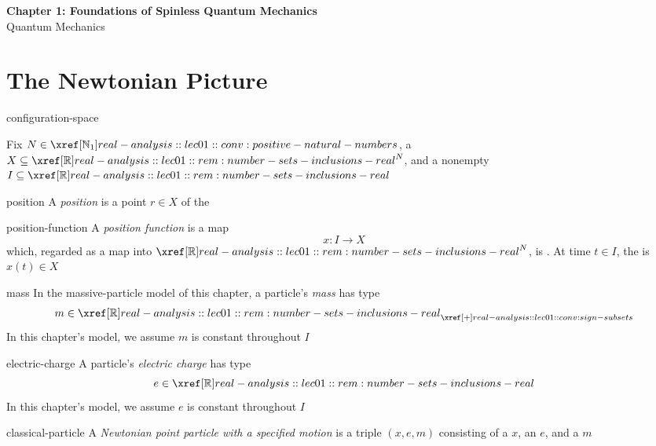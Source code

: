 \documentclass[12pt]{article}
\begin{document}
\begin{center}
  {\LARGE\bfseries Chapter 1: Foundations of Spinless Quantum Mechanics}\\[0.25em]
  {\large Quantum Mechanics}\\[0.15em]
\end{center}

\section{The Newtonian Picture}

\begin{dfn}{configuration-space}
  \todo
\end{dfn}

Fix $N\in\NNOne$, a 
$X\subseteq\RR^N$, and a nonempty 
$I\subseteq\RR$

\begin{dfn}[Position]{position}
  A \emph{position} is a point $r\in X$ of the
\end{dfn}

\begin{dfn}{position-function}
  A \emph{position function} is a map
  \[
    x:I\to X
  \]
  which, regarded as a map into $\RR^N$, is
  .
  At time $t\in I$, the  is $x(t)\in X$
\end{dfn}

\begin{dfn}[Mass]{mass}
  In the massive-particle model of this chapter, a particle's \emph{mass} has type
  \[
    m\in\apos{\RR}
  \]
  In this chapter's model, we assume $m$ is constant throughout $I$
\end{dfn}

\begin{dfn}{electric-charge}
  A particle's \emph{electric charge} has type
  \[
    e\in\RR
  \]
  In this chapter's model, we assume $e$ is constant throughout $I$
\end{dfn}

\begin{dfn}{classical-particle}
  A \emph{Newtonian point particle with a specified motion} is a triple
  $(x,e,m)$ consisting of a  $x$,
  an  $e$, and a  $m$
\end{dfn}
\end{document}
